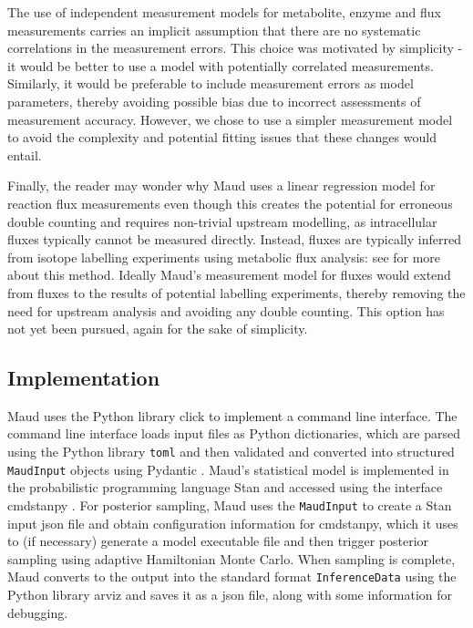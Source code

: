\documentclass[journal=,manuscript=]{achemso}
\begin{document}
The use of independent measurement models for metabolite, enzyme and
flux measurements carries an implicit assumption that there are no
systematic correlations in the measurement errors. This choice was
motivated by simplicity - it would be better to use a model with
potentially correlated measurements. Similarly, it would be preferable
to include measurement errors as model parameters, thereby avoiding
possible bias due to incorrect assessments of measurement accuracy.
However, we chose to use a simpler measurement model to avoid the
complexity and potential fitting issues that these changes would entail.

Finally, the reader may wonder why Maud uses a linear regression model
for reaction flux measurements even though this creates the potential
for erroneous double counting and requires non-trivial upstream
modelling, as intracellular fluxes typically cannot be measured
directly. Instead, fluxes are typically inferred from isotope labelling
experiments using metabolic flux analysis: see
\citet{daiUnderstandingMetabolismFlux2017} for more about this method.
Ideally Maud's measurement model for fluxes would extend from fluxes to
the results of potential labelling experiments, thereby removing the
need for upstream analysis and avoiding any double counting. This option
has not yet been pursued, again for the sake of simplicity.

\hypertarget{implementation}{%
\subsection{Implementation}\label{implementation}}

Maud uses the Python library click
\citep{clickdevelopersClickPythonComposable2022} to implement a command
line interface. The command line interface loads input files as Python
dictionaries, which are parsed using the Python library \texttt{toml}
\citep{pearsonTomlPythonLibrary2020} and then validated and converted
into structured \texttt{MaudInput} objects using Pydantic
\citep{pydanticdevelopersPydantic2022}. Maud's statistical model is
implemented in the probabilistic programming language Stan
\citep{carpenterStanProbabilisticProgramming2017} and accessed using the
interface cmdstanpy \citep{standevelopmentteamCmdStanPy2022}. For
posterior sampling, Maud uses the \texttt{MaudInput} to create a Stan
input json file and obtain configuration information for cmdstanpy,
which it uses to (if necessary) generate a model executable file and
then trigger posterior sampling using adaptive Hamiltonian Monte Carlo.
When sampling is complete, Maud converts to the output into the standard
format \texttt{InferenceData} using the Python library arviz
\citep{kumarArviZUnifiedLibrary2019} and saves it as a json file, along
with some information for debugging.
\end{document}
